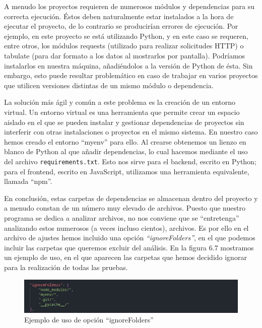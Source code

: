 \documentclass[a4paper, 12pt]{book}
\begin{document}
A menudo los proyectos requieren de numerosos módulos y dependencias para su correcta ejecución. Éstos deben naturalmente estar instalados a la hora de ejecutar el proyecto, de lo contrario se producirían errores de ejecución. Por ejemplo, en este proyecto se está utilizando Python, y en este caso se requeren, entre otros, los módulos requests (utilizado para realizar solicitudes HTTP) o tabulate (para dar formato a los datos al mostrarlos por pantalla). Podríamos instalarlos en nuestra máquina, añadiéndolos a la versión de Python de ésta. Sin embargo, esto puede resultar problemático en caso de trabajar en varios proyectos que utilicen versiones distintas de un mismo módulo o dependencia.

La solución más ágil y común a este problema es la creación de un entorno virtual. Un entorno virtual es una herramienta que permite crear un espacio aislado en el que se pueden instalar y gestionar dependencias de proyectos sin interferir con otras instalaciones o proyectos en el mismo sistema. En nuestro caso hemos creado el entorno ``myenv'' para ello. Al crearse obtenemos un lienzo en blanco de Python al que añadir dependencias, lo cual hacemos mediante el uso del archivo \texttt{requirements.txt}. Esto nos sirve para el backend, escrito en Python; para el frontend, escrito en JavaScript, utilizamos una herramienta equivalente, llamada ``npm''.

En conclusión, estas carpetas de dependencias se almacenan dentro del proyecto y a menudo constan de un número muy elevado de archivos. Puesto que nuestro programa se dedica a analizar archivos, no nos conviene que se ``entretenga'' analizando estos numerosos (a veces incluso cientos), archivos. Es por ello en el archivo de ajustes hemos incluido una opción \textit{``ignoreFolders''}, en el que podemos incluir las carpetas que queremos excluir del análisis. En la figura 6.7 mostramos un ejemplo de uso, en el que aparecen las carpetas que hemos decidido ignorar para la realización de todas las pruebas.

\begin{figure}[H]
    \centering
    \includegraphics[width=\textwidth, keepaspectratio]{img/results/ignore_folders.png}
    \caption{Ejemplo de uso de opción ``ignoreFolders''}
    \label{fig:ignore_folders}
\end{figure}
\end{document}
